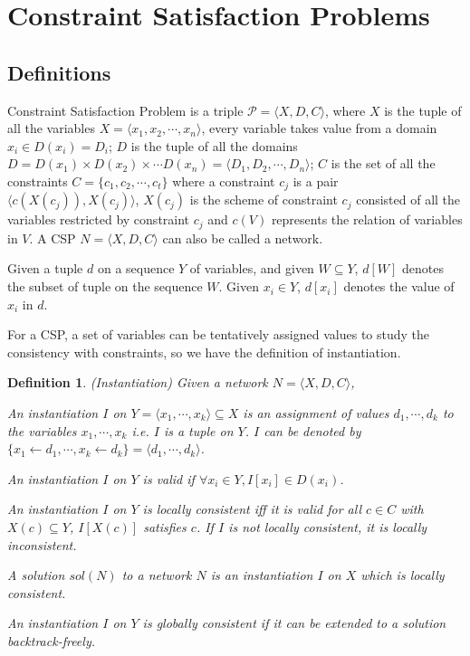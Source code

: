 \documentclass[a4paper, 12pt]{report}
\newtheorem{definition}{Definition}[subsection]
\begin{document}
    
    \section {Constraint Satisfaction Problems}

        \subsection {Definitions}
            Constraint Satisfaction Problem is a triple $\mathcal P=\langle X, D, C\rangle$, where $X$ is the tuple of all the variables $X=\langle x_1,x_2,\cdots,x_n\rangle$, every variable takes value from a domain $x_i\in D(x_i)=D_i$; $D$ is the tuple of all the domains $D=D(x_1)\times D(x_2)\times \cdots D(x_n)=\langle D_1,D_2,\cdots,D_n\rangle$; $C$ is the set of all the constraints $C=\{c_1,c_2,\cdots,c_t\}$ where a constraint $c_j$ is a pair $\langle c(X(c_j)),
            X(c_j)\rangle$, $X(c_j)$ is the scheme of constraint $c_j$ consisted of all the variables restricted by constraint $c_j$ and $c(V)$ represents the relation of variables in $V$. A CSP $N=\langle X,D,C\rangle$ can also be called a network.

            Given a tuple $d$ on a sequence $Y$ of variables, and given $W\subseteq Y$, $d[W]$ denotes the subset of tuple on the sequence $W$. Given $x_i\in Y$, $d[x_i]$ denotes the value of $x_i$ in $d$.

            For a CSP, a set of variables can be tentatively assigned values to study the consistency with constraints, so we have the definition of instantiation\cite{rossi2006handbook}.
            \begin{definition}
                (Instantiation) Given a network $N=\langle X,D,C\rangle$,

                An instantiation $I$ on $Y=\langle x_1,\cdots,x_k\rangle \subseteq X$ is an assignment of values $d_1,\cdots, d_k$ to the variables $x_1, \cdots, x_k$ i.e. $I$ is a tuple on $Y$. $I$ can be denoted by $\{x_1\leftarrow d_1, \cdots, x_k\leftarrow d_k\}=\langle d_1, \cdots, d_k\rangle$.

                An instantiation $I$ on $Y$ is valid if $\forall x_i\in Y, I[x_i]\in D(x_i)$.

                An instantiation $I$ on $Y$ is locally consistent iff it is valid for all $c\in C$ with $X(c)\subseteq Y$, $I[X(c)]$ satisfies $c$. If $I$ is not locally consistent, it is locally inconsistent.

                A solution $sol(N)$ to a network $N$ is an instantiation $I$ on $X$ which is locally consistent. 

                An instantiation $I$ on $Y$ is globally consistent if it can be extended to a solution backtrack-freely.
            \end{definition}
\end{document}
